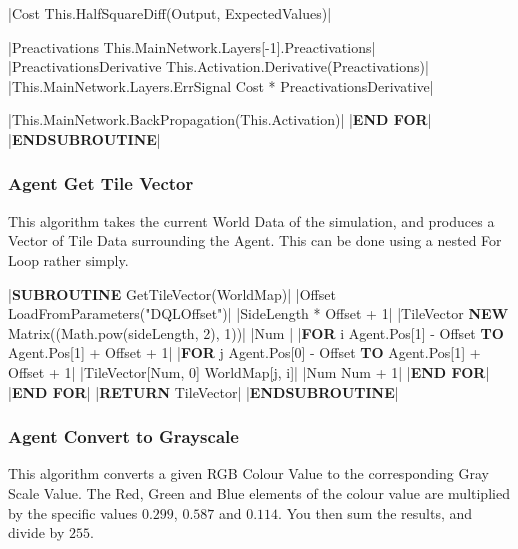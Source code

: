 \begin{flushleft}
\begin{pseudocode}
        |Cost \leftarrow This.HalfSquareDiff(Output, ExpectedValues)|

        |Preactivations \leftarrow This.MainNetwork.Layers[-1].Preactivations|
        |PreactivationsDerivative \leftarrow This.Activation.Derivative(Preactivations)|
        |This.MainNetwork.Layers.ErrSignal \leftarrow Cost * PreactivationsDerivative|

        |This.MainNetwork.BackPropagation(This.Activation)|
    |\textbf{END FOR}|
|\textbf{ENDSUBROUTINE}|
                \end{pseudocode}

                \vspace{0.5cm}
            \subsubsection{Agent Get Tile Vector}
                This algorithm takes the current World Data of the simulation, and produces a Vector of Tile Data surrounding the Agent. This can
                be done using a nested For Loop rather simply.

                \vspace{0.2cm}
                \begin{pseudocode}
|\textbf{SUBROUTINE} GetTileVector(WorldMap)|
    |Offset \leftarrow LoadFromParameters("DQLOffset")|
    |SideLength  * Offset + 1|
    |TileVector \leftarrow \textbf{NEW} Matrix((Math.pow(sideLength, 2), 1))|
    |Num |
    |\textbf{FOR} i \leftarrow Agent.Pos[1] - Offset \textbf{TO} Agent.Pos[1] + Offset + 1|
        |\textbf{FOR} j \leftarrow Agent.Pos[0] - Offset \textbf{TO} Agent.Pos[1] + Offset + 1|
            |TileVector[Num, 0] \leftarrow WorldMap[j, i]|
            |Num \leftarrow Num + 1|
        |\textbf{END FOR}|
    |\textbf{END FOR}|
    |\textbf{RETURN} TileVector|
|\textbf{ENDSUBROUTINE}|
                \end{pseudocode}
                
                \vspace{0.5cm}
            \subsubsection{Agent Convert to Grayscale}
                This algorithm converts a given RGB Colour Value to the corresponding Gray Scale Value. The Red, Green and Blue elements of
                the colour value are multiplied by the specific values $0.299$, $0.587$ and $0.114$. You then sum the results, and divide by 
                $255$.


\end{flushleft}
